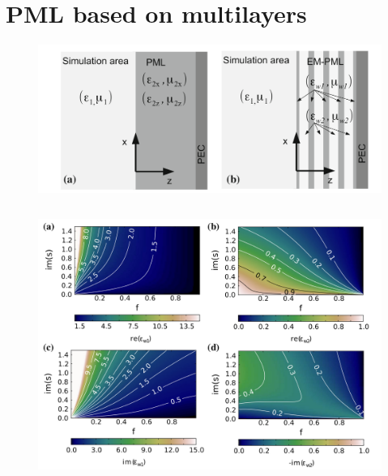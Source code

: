 \documentclass{beamer}
\begin{document}
\section{PML based on multilayers}
\begin{frame}
	\begin{figure}[htb]
				\includegraphics[width=\textwidth]{../images/pml/oqe_schemat.png}
			\end{figure}

	\begin{columns}
		\begin{column}{0.5\textwidth}

		\end{column}
		\begin{column}{0.5\textwidth}

		\end{column}
	\end{columns}
	{\tiny \cite{ania2015}	}
\end{frame}

\begin{frame}
	\begin{figure}[htb]
				\includegraphics[width=\textwidth]{../images/pml/oqe_materials.png}
	\end{figure}
		
\end{frame}
\end{document}
